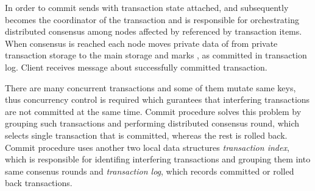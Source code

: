In order to commit \transaction \client sends \txCommitMessage with transaction state attached, and subsequently  becomes the coordinator of the transaction and is responsible for orchestrating distributed consensus among nodes affected by \transaction referenced by transaction items. When consensus is reached each node moves private data of \transaction from private transaction storage to the main storage and marks \transaction, as committed in transaction log. Client receives message \txCommitResonseMessage about successfully committed transaction.

There are many concurrent transactions and some of them mutate same keys, thus concurrency control is required which gurantees that interfering transactions are not committed at the same time. Commit procedure solves this problem by grouping such transactions and performing distributed consensus round, which selects single transaction that is committed, whereas the rest is rolled back.
Commit procedure uses another two local data structures \emph{transaction index}, which is responsible for identifing interfering transactions and grouping them into same consenus rounds and \emph{transaction log}, which records committed or rolled back transactions.


